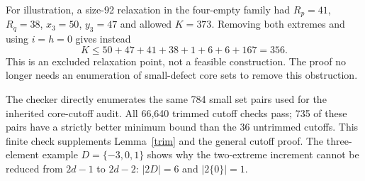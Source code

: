 \documentclass[11pt,a4paper]{article}
\begin{document}
For illustration, a size-92 relaxation in the four-empty family had
$R_p=41$, $R_q=38$, $x_3=50$, $y_3=47$ and allowed $K=373$.
Removing both extremes and using $i=h=0$ gives instead
\[
 K\le50+47+41+38+1+6+6+167=356.
\]
This is an excluded relaxation point, not a feasible construction.
The proof no longer needs an enumeration of small-defect core sets
to remove this obstruction.

The checker directly enumerates the same 784 small set pairs used for
the inherited core-cutoff audit. All 66,640 trimmed cutoff checks pass;
735 of these pairs have a strictly better minimum bound than the 36
untrimmed cutoffs. This finite check supplements Lemma~\ref{trim} and
the general cutoff proof. The three-element example $D=\{-3,0,1\}$
shows why the two-extreme increment cannot be reduced from $2d-1$
to $2d-2$: $|2D|=6$ and $|2\{0\}|=1$.
\end{document}
